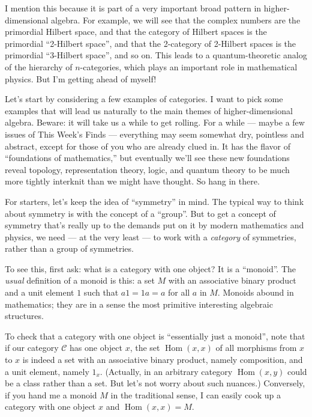 \documentclass{article}
\begin{document}
I mention this because it is part of a very important broad pattern in
higher-dimensional algebra. For example, we will see that the complex
numbers are the primordial Hilbert space, and that the category of
Hilbert spaces is the primordial ``2-Hilbert space'', and that the
2-category of 2-Hilbert spaces is the primordial ``3-Hilbert space'',
and so on. This leads to a quantum-theoretic analog of the hierarchy of
\(n\)-categories, which plays an important role in mathematical physics.
But I'm getting ahead of myself!

Let's start by considering a few examples of categories. I want to pick
some examples that will lead us naturally to the main themes of
higher-dimensional algebra. Beware: it will take us a while to get
rolling. For a while --- maybe a few issues of This Week's Finds ---
everything may seem somewhat dry, pointless and abstract, except for
those of you who are already clued in. It has the flavor of
``foundations of mathematics,'' but eventually we'll see these new
foundations reveal topology, representation theory, logic, and quantum
theory to be much more tightly interknit than we might have thought. So
hang in there.

For starters, let's keep the idea of ``symmetry'' in mind. The typical
way to think about symmetry is with the concept of a ``group''. But to
get a concept of symmetry that's really up to the demands put on it by
modern mathematics and physics, we need --- at the very least --- to
work with a \emph{category} of symmetries, rather than a group of
symmetries.

To see this, first ask: what is a category with one object? It is a
``monoid''. The \emph{usual} definition of a monoid is this: a set \(M\)
with an associative binary product and a unit element \(1\) such that
\(a1 = 1a = a\) for all \(a\) in \(M\). Monoids abound in mathematics;
they are in a sense the most primitive interesting algebraic structures.

To check that a category with one object is ``essentially just a
monoid'', note that if our category \(\mathcal{C}\) has one object
\(x\), the set \(\operatorname{Hom}(x,x)\) of all morphisms from \(x\)
to \(x\) is indeed a set with an associative binary product, namely
composition, and a unit element, namely \(1_x\). (Actually, in an
arbitrary category \(\operatorname{Hom}(x,y)\) could be a class rather
than a set. But let's not worry about such nuances.) Conversely, if you
hand me a monoid \(M\) in the traditional sense, I can easily cook up a
category with one object \(x\) and \(\operatorname{Hom}(x,x) = M\).
\end{document}
